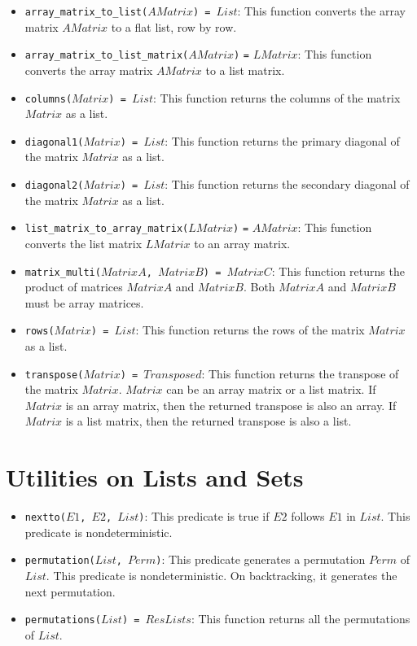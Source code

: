 \begin{itemize}
\item \texttt{array\_matrix\_to\_list($AMatrix$) = $List$}: This function converts the array matrix $AMatrix$ to a flat list, row by row.
\item \texttt{array\_matrix\_to\_list\_matrix($AMatrix$)} \texttt{=} \texttt{$LMatrix$}: This function converts the array matrix $AMatrix$ to a list matrix.
\item \texttt{columns($Matrix$) = $List$}: This function returns the columns of the matrix $Matrix$ as a list.
\item \texttt{diagonal1($Matrix$) = $List$}: This function returns the primary diagonal of the matrix $Matrix$ as a list.
\item \texttt{diagonal2($Matrix$) = $List$}: This function returns the secondary diagonal of the matrix $Matrix$ as a list.
\item \texttt{list\_matrix\_to\_array\_matrix($LMatrix$)} \texttt{=} \texttt{$AMatrix$}: This function converts the list matrix $LMatrix$ to an array matrix.
\item \texttt{matrix\_multi($MatrixA$, $MatrixB$) = $MatrixC$}: This function returns the product of matrices $MatrixA$ and $MatrixB$. Both $MatrixA$ and $MatrixB$ must be array matrices.
\item \texttt{rows($Matrix$) = $List$}: This function returns the rows of the matrix $Matrix$ as a list.
\item \texttt{transpose($Matrix$) = $Transposed$}: This function returns the transpose of the matrix $Matrix$. $Matrix$ can be an array matrix or a list matrix. If $Matrix$ is an array matrix, then the returned transpose is also an array. If $Matrix$ is a list matrix, then the returned transpose is also a list.
\end{itemize}

\section{Utilities on Lists and Sets}
\begin{itemize}
\item \texttt{nextto($E1$, $E2$, $List$)}: This predicate is true if \texttt{$E2$} follows \texttt{$E1$} in \texttt{$List$}. This predicate is nondeterministic.
\item \texttt{permutation($List$, $Perm$)}: This predicate generates a permutation $Perm$ of $List$. This predicate is nondeterministic. On backtracking, it generates the next permutation.
\item \texttt{permutations($List$) = $ResLists$}: This function returns all the permutations of $List$.
\end{itemize}

\ignore{

}
